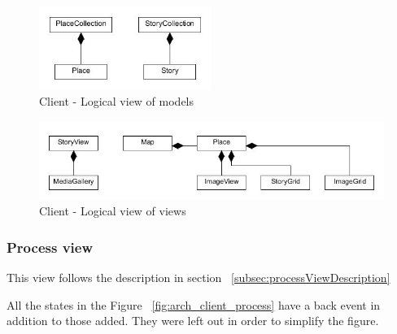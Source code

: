 \documentclass[11pt]{book}
\begin{document}
\begin{figure}[H]
      \centering
      \includegraphics[width=0.5\textwidth]{Figures/Architecture/clientLogicalModels.jpg}
      \caption{Client - Logical view of models}
      \label{fig:arch_client_logical_models}
\end{figure}

\begin{figure}[H]
      \centering
      \includegraphics[width=1.0\textwidth]{Figures/Architecture/clientLogicalViews.jpg}
      \caption{Client - Logical view of views}
      \label{fig:arch_client_logical_views}
\end{figure}

\subsubsection{Process view}
This view follows the description in section ~\ref{subsec:processViewDescription}

All the states in the Figure ~\ref{fig:arch_client_process} have a back event in addition to those added. They were left out in order to simplify the figure.
\end{document}
